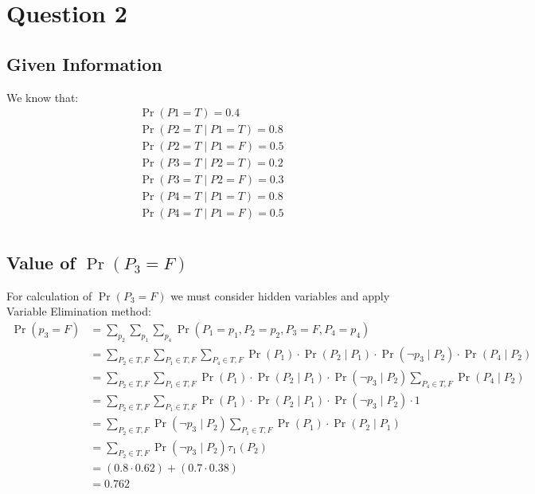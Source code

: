 \documentclass{article}
\begin{document}
\pagebreak

\section{Question 2}
\subsection{Given Information}
We know that:
\begin{align*}
&\Pr(P1 = T) = 0.4 \\
&\Pr(P2 = T \mid P1 = T) = 0.8 \\
&\Pr(P2 = T \mid P1 = F) = 0.5 \\
&\Pr(P3 = T \mid P2 = T) = 0.2 \\
&\Pr(P3 = T \mid P2 = F) = 0.3 \\
&\Pr(P4 = T \mid P1 = T) = 0.8 \\
&\Pr(P4 = T \mid P1 = F) = 0.5 \\
\end{align*}

\bigskip
\hrulefill
\bigskip

\subsection{Value of $\Pr(P_3 = F)$}
For calculation of $\Pr(P_3 = F)$ we must consider hidden variables and apply Variable Elimination method:
\[
    \begin{aligned}
    \Pr(p_3 = F) &= \sum_{p_2} \sum_{p_1} \sum_{p_4} \Pr(P_1 = p_1, P_2 = p_2, P_3 = F, P_4 = p_4) \\
    &= \sum_{P_2 \in T,F} \sum_{P_1 \in T,F} \sum_{P_4 \in T,F} \Pr(P_1) \cdot \Pr(P_2 \mid P_1) \cdot \Pr(\neg p_3 \mid P_2) \cdot \Pr(P_4 \mid P_2) \\
    &= \sum_{P_2 \in T,F} \sum_{P_1 \in T,F} \Pr(P_1) \cdot \Pr(P_2 \mid P_1) \cdot \Pr(\neg p_3 \mid P_2) \sum_{P_4 \in T,F} \Pr(P_4 \mid P_2) \\
    &= \sum_{P_2 \in T,F} \sum_{P_1 \in T,F} \Pr(P_1) \cdot \Pr(P_2 \mid P_1) \cdot \Pr(\neg p_3 \mid P_2) \cdot 1 \\
    &= \sum_{P_2 \in T,F} \Pr(\neg p_3 \mid P_2) \sum_{P_1 \in T,F} \Pr(P_1) \cdot \Pr(P_2 \mid P_1) \\
    &= \sum_{P_2 \in T,F} \Pr(\neg p_3 \mid P_2) \tau_1 (P_2) \\
    &= (0.8 \cdot 0.62) + (0.7 \cdot 0.38) \\
    &= 0.762
    \end{aligned}
\]
\end{document}
